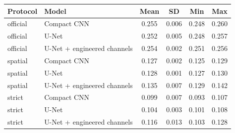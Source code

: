 \begin{tabular}{llcccc}
\toprule
Protocol & Model & Mean & SD & Min & Max \\
\midrule
official & Compact CNN & 0.255 & 0.006 & 0.248 & 0.260 \\
official & U-Net & 0.252 & 0.005 & 0.248 & 0.257 \\
official & U-Net + engineered channels & 0.254 & 0.002 & 0.251 & 0.256 \\
spatial & Compact CNN & 0.127 & 0.002 & 0.125 & 0.129 \\
spatial & U-Net & 0.128 & 0.001 & 0.127 & 0.130 \\
spatial & U-Net + engineered channels & 0.135 & 0.007 & 0.129 & 0.142 \\
strict & Compact CNN & 0.099 & 0.007 & 0.093 & 0.107 \\
strict & U-Net & 0.104 & 0.003 & 0.101 & 0.108 \\
strict & U-Net + engineered channels & 0.116 & 0.013 & 0.103 & 0.128 \\
\bottomrule
\end{tabular}
